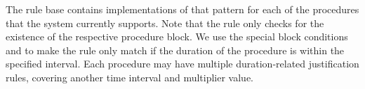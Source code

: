 
The rule base contains implementations of that pattern for each of the procedures that the system currently supports.
Note that the rule only checks for the existence of the respective procedure block.
We use the special block conditions  and  to make the rule only match if the duration of the procedure is within the specified interval.
Each procedure may have multiple duration-related justification rules, covering another time interval and multiplier value.

%
